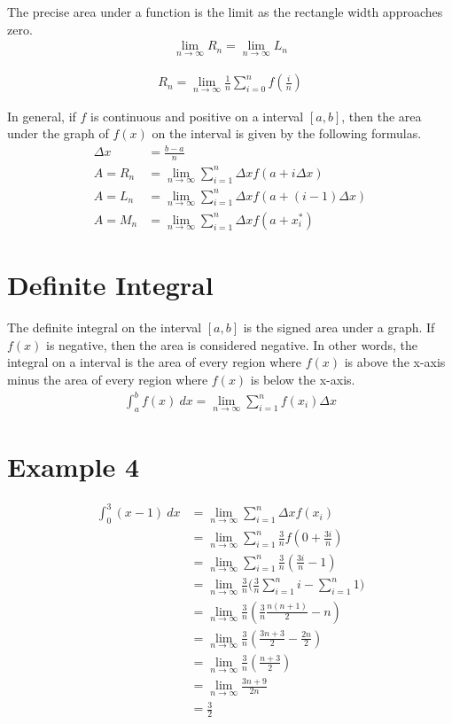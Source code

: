 \documentclass{article}
\theoremstyle{mytheoremstyle}
\theoremstyle{mytheoremstyle}
\theoremstyle{myproblemstyle}
\begin{document}
    The precise area under a function is the limit as the rectangle width
    approaches zero.
    \begin{align*}
        \lim_{n\to \infty} R_n = \lim_{n\to \infty} L_n
    \end{align*}

    \begin{align*}
        R_n = \lim_{n\to \infty} \frac{1}{n} \sum_{i=0}^{n} f(\frac{i}{n})
    \end{align*}

    In general, if $f$ is continuous and positive on a interval $[a,b]$,
    then the area under the graph of $f(x)$ on the interval is given by the
    following formulas.
    \begin{align*}
        \Delta x &= \frac{b-a}{n} \\
        A = R_n &= \lim_{n\to \infty} \sum_{i=1}^{n} \Delta x f(a+i\Delta x) \\
        A = L_n &= \lim_{n\to \infty} \sum_{i=1}^{n} \Delta x f(a+(i-1)\Delta x) \\
        A = M_n &= \lim_{n\to \infty} \sum_{i=1}^{n} \Delta x f(a+x_i^*)
    \end{align*}

    \section*{Definite Integral}
    The definite integral on the interval $[a,b]$ is the signed area under a
    graph. If $f(x)$ is negative, then the area is considered negative. In
    other words, the integral on a interval is the area of every region
    where $f(x)$ is above the x-axis minus the area of every region where
    $f(x)$ is below the x-axis.
    \begin{align*}
        \int_{a}^{b} f(x) \ dx = \lim_{n\to \infty} \sum_{i=1}^{n} f(x_i)\Delta x
    \end{align*}

    \section*{Example 4}
    \begin{align*}
        \int_{0}^{3} (x-1) \ dx
        &= \lim_{n\to \infty} \sum_{i=1}^{n} \Delta x f(x_i) \\
        &= \lim_{n\to \infty} \sum_{i=1}^{n} \frac{3}{n} f(0+\frac{3i}{n}) \\
        &= \lim_{n\to \infty} \sum_{i=1}^{n} \frac{3}{n} (\frac{3i}{n} - 1) \\
        &= \lim_{n\to \infty} \frac{3}{n}
            \Big(\frac{3}{n} \sum_{i=1}^{n} i -
        \sum_{i=1}^{n} 1\Big) \\
        &= \lim_{n\to \infty} \frac{3}{n} (\frac{3}{n} \frac{n(n+1)}{2} - n) \\
        &= \lim_{n\to \infty} \frac{3}{n} ( \frac{3n+3}{2} - \frac{2n}{2} ) \\
        &= \lim_{n\to \infty} \frac{3}{n} ( \frac{n+3}{2}) \\
        &= \lim_{n\to \infty} \frac{3n+9}{2n} \\
        &= \frac{3}{2}
    \end{align*}
\end{document}
